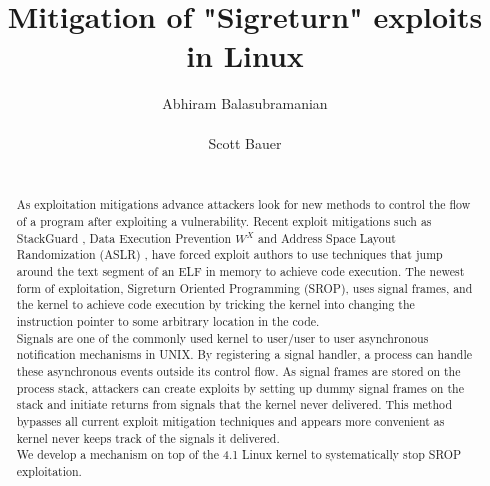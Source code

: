 \documentclass{sig-alternate-05-2015}
\begin{document}
\title{Mitigation of "Sigreturn" exploits in Linux}
\author{
\alignauthor
Abhiram Balasubramanian\\
       \\
\alignauthor
Scott Bauer\\
       \\
}

\maketitle
\begin{abstract}
As exploitation mitigations advance attackers look for new methods to control the flow of a program after exploiting a vulnerability. Recent exploit mitigations such as StackGuard \cite{cowan1998stackguard}, Data Execution Prevention \(W^X\) \cite{WXORX} and Address Space Layout Randomization (ASLR) \cite{ASLR}, have forced exploit authors to use techniques that jump around the text segment of an ELF in memory to achieve code execution. The newest form of exploitation, Sigreturn Oriented Programming (SROP), uses signal frames, and the kernel to achieve code execution by tricking the kernel into changing the instruction pointer to some arbitrary location in the code.\\
Signals are one of the commonly used kernel to user/user to user asynchronous notification mechanisms in UNIX. By registering a signal handler, a process can handle these asynchronous events outside its control flow. As signal frames are stored on the process stack, attackers can create exploits by setting up dummy signal frames on the stack and initiate returns from signals that the kernel never delivered. This method bypasses all current exploit mitigation techniques and  appears more convenient as kernel never keeps track of the signals it delivered.\\
We develop a mechanism on top of the 4.1 Linux kernel to systematically stop SROP exploitation.

\end{abstract}
\end{document}
